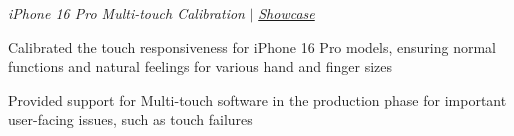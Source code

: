 \documentclass[letterpaper,11pt]{article}
\newcommand{\resumeItem}[1]{
  \item\small{
    {#1 \vspace{-2pt}}
  }
}
\begin{document}

            \item[]\small \hspace{-0.2in} \textit{iPhone 16 Pro Multi-touch Calibration} $|$ \emph{\href{https://www.apple.com/iphone-16-pro/}{\color{blue}Showcase}}
            \resumeItem{Calibrated the touch responsiveness for iPhone 16 Pro models, ensuring normal functions and natural feelings for various hand and finger sizes}
            \resumeItem{Provided support for Multi-touch software in the production phase for important user-facing issues, such as touch failures}
\end{document}

